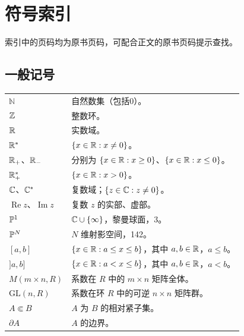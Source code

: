 \chapter*{符号索引}
索引中的页码均为原书页码，可配合正文的原书页码提示查找。
\section*{一般记号}
\begin{longtable}{p{}p{}}
$\mathbb N$ & 自然数集（包括0）。\\
$\mathbb Z$ & 整数环。\\
$\mathbb R$ & 实数域。\\
$\mathbb R^*$ & $\{x\in\mathbb R:x\ne0\}$。\\
$\mathbb R_+$、$\mathbb R_-$ & 分别为 $\{x\in\mathbb R:x\ge0\}$、$\{x\in\mathbb R:x\le0\}$。\\
$\mathbb R_+^*$ & $\{x\in\mathbb R:x>0\}$。\\
$\mathbb C$、$\mathbb C^*$ & 复数域；$\{z\in\mathbb C:z\ne0\}$。\\
$\operatorname{Re}z$、$\operatorname{Im}z$ & 复数 $z$ 的实部、虚部。\\
$\mathbb P^1$ & $\mathbb C\cup\{\infty\}$，黎曼球面，3。\\
$\mathbb P^N$ & $N$ 维射影空间，142。\\
$[a,b]$ & $\{x\in\mathbb R:a\le x\le b\}$，其中 $a,b\in\mathbb R$，$a\le b$。\\
$]a,b]$ & $\{x\in\mathbb R:a<x\le b\}$，其中 $a,b\in\mathbb R$，$a<b$。\\
$M(m\times n,R)$ & 系数在 $R$ 中的 $m\times n$ 矩阵全体。\\
$\mathrm{GL}(n,R)$ & 系数在环 $R$ 中的可逆 $n\times n$ 矩阵群。\\
$A\Subset B$ & $A$ 为 $B$ 的相对紧子集。\\
$\partial A$ & $A$ 的边界。\\
\end{longtable}
